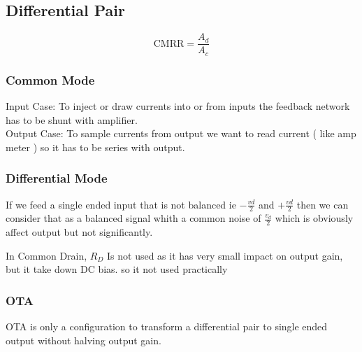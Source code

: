 \subsection{Differential Pair}
$$ \text{CMRR} = \frac{A_d}{A_c}$$
\subsubsection{Common Mode}
Input Case: To inject or draw currents into or from inputs the feedback network has to be shunt with amplifier.\\
Output Case: To sample currents from output we want to read current ( like amp meter ) so it has to be series with output.
\subsubsection{Differential Mode}
If we feed a single ended input that is not balanced ie $-\frac{vd}{2}$ and $+\frac{vd}{2}$ then we can consider that as a balanced signal whith a common noise of $\frac{v_d}{2}$ which is obviously affect output but not significantly.
\par
\setlength{\parindent}{0.5cm} %
In Common Drain, $R_D$ Is not used as it has very small impact on output gain, but it take down DC bias. so it not used practically
\lipsum[2]
\setlength{\parindent}{0.0cm} 

\subsubsection{OTA}\vspace{0.5em}

OTA is only a configuration to transform a differential pair to single ended output without halving output gain.

